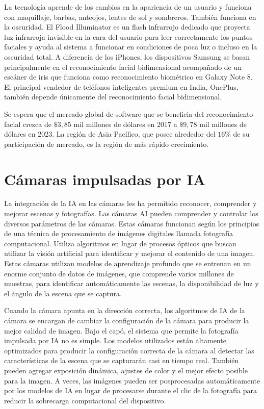 La tecnología aprende de los cambios en la apariencia de un usuario y funciona con maquillaje, barbas, anteojos, lentes de sol y sombreros. También funciona en la oscuridad. El Flood Illuminator es un flash infrarrojo dedicado que proyecta luz infrarroja invisible en la cara del usuario para leer correctamente los puntos faciales y ayuda al sistema a funcionar en condiciones de poca luz o incluso en la oscuridad total. A diferencia de los iPhones, los dispositivos Samsung se basan principalmente en el reconocimiento facial bidimensional acompañado de un escáner de iris que funciona como reconocimiento biométrico en Galaxy Note 8. El principal vendedor de teléfonos inteligentes premium en India, OnePlus, también depende únicamente del reconocimiento facial bidimensional.

Se espera que el mercado global de software que se beneficia del reconocimiento facial crezca de $\$ 3,85$ mil millones de dólares en 2017 a $\$ 9,78$ mil millones de dólares en 2023. La región de Asia Pacífico, que posee alrededor del $16\%$ de su participación de mercado, es la región de más rápido crecimiento.

\section{Cámaras impulsadas por IA}

La integración de la IA en las cámaras les ha permitido reconocer, comprender y mejorar escenas y fotografías. Las cámaras AI pueden comprender y controlar los diversos parámetros de las cámaras. Estas cámaras funcionan según los principios de una técnica de procesamiento de imágenes digitales llamada fotografía computacional. Utiliza algoritmos en lugar de procesos ópticos que buscan utilizar la visión artificial para identificar y mejorar el contenido de una imagen. Estas cámaras utilizan modelos de aprendizaje profundo que se entrenan en un enorme conjunto de datos de imágenes, que comprende varios millones de muestras, para identificar automáticamente las escenas, la disponibilidad de luz y el ángulo de la escena que se captura.

Cuando la cámara apunta en la dirección correcta, los algoritmos de IA de la cámara se encargan de cambiar la configuración de la cámara para producir la mejor calidad de imagen. Bajo el capó, el sistema que permite la fotografía impulsada por IA no es simple. Los modelos utilizados están altamente optimizados para producir la configuración correcta de la cámara al detectar las características de la escena que se capturarán casi en tiempo real. También pueden agregar exposición dinámica, ajustes de color y el mejor efecto posible para la imagen. A veces, las imágenes pueden ser posprocesadas automáticamente por los modelos de IA en lugar de procesarse durante el clic de la fotografía para reducir la sobrecarga computacional del dispositivo.


